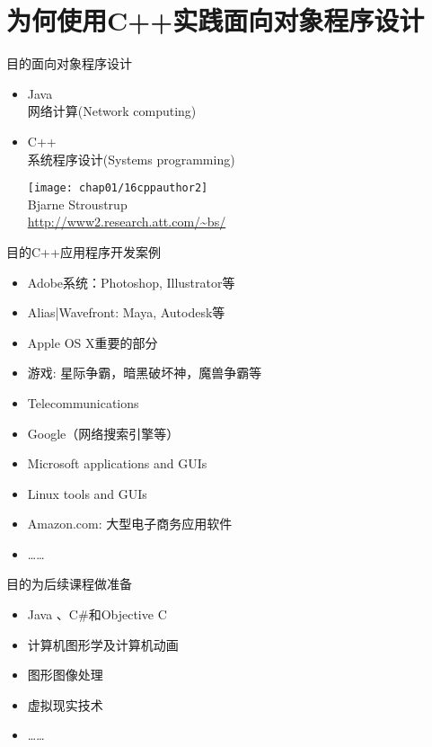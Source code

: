 
\section[目的]{为何使用C++实践面向对象程序设计}\label{sec:chap01-sec05}

\begin{frame}{目的}{面向对象程序设计}
  \stretchon
  \begin{itemize}
  \item Java\\
    网络计算(Network computing)
  \item C++\\
    系统程序设计(Systems programming)\\
    \begin{center}
      \texttt{[image: chap01/16cppauthor2]}\\
      \tiny Bjarne Stroustrup\\
      \url{http://www2.research.att.com/~bs/}
    \end{center}    
  \end{itemize}
  \stretchoff
\end{frame}

\begin{frame}{目的}{C++应用程序开发案例}
  \stretchon
  \begin{itemize}
  \item Adobe系统：Photoshop, Illustrator等
  \item Alias|Wavefront: Maya, Autodesk等
  \item Apple OS X重要的部分
  \item 游戏: 星际争霸，暗黑破坏神，魔兽争霸等
  \item Telecommunications
  \item Google（网络搜索引擎等）
  \item Microsoft applications and GUIs
  \item Linux tools and GUIs
  \item Amazon.com: 大型电子商务应用软件
  \item \ldots\ldots
  \end{itemize}
  \stretchoff
\end{frame}

\begin{frame}{目的}{为后续课程做准备}
  \stretchon
  \begin{itemize}
  \item Java 、C\#和Objective C
  \item 计算机图形学及计算机动画
  \item 图形图像处理
  \item 虚拟现实技术
  \item \ldots\ldots
  \end{itemize}
  \stretchoff
\end{frame}

